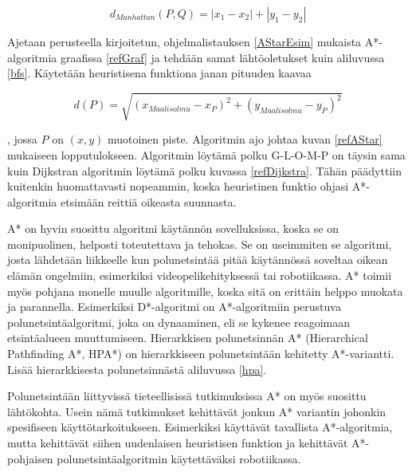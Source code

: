 \[ d_{Manhattan}(P,Q) =  |x_1 - x_2| + |y_1 - y_2|\]
\par

	Ajetaan \textcite{MathewAndMalathy} perusteella kirjoitetun, 
ohjelmalistauksen \ref{AStarEsim} mukaista A*-algoritmia graafissa 
\ref{refGraf} ja tehdään samat lähtöoletukset kuin aliluvussa \ref{bfs}. 
Käytetään heuristisena funktiona janan pituuden kaavaa

\[ d(P) = \sqrt{(x_{Maalisolmu}-x_P)^2 + (y_{Maalisolmu}-y_P)^2} \]

, jossa $P$ on $(x,y)$ muotoinen piste. Algoritmin ajo johtaa kuvan 
\ref{refAStar} mukaiseen lopputulokseen. Algoritmin löytämä polku G-L-O-M-P on 
täysin sama kuin Dijkstran algoritmin löytämä polku kuvassa 
\ref{refDijkstra}. Tähän päädyttiin kuitenkin huomattavasti nopeammin, koska 
heuristinen funktio ohjasi A*-algoritmia etsimään reittiä oikeasta suunnasta. 
\par
	A* on hyvin suosittu algoritmi käytännön sovelluksissa, koska se on 
monipuolinen, helposti toteutettava ja tehokas. Se on useimmiten se algoritmi, 
josta lähdetään liikkeelle kun polunetsintää pitää käytännössä soveltaa 
oikean elämän ongelmiin, esimerkiksi videopelikehityksessä tai 
robotiikassa.\cite{ProcediaAStar} A* toimii myös pohjana monelle muulle 
algoritmille, koska sitä on erittäin helppo muokata ja 
parannella.\cite{ProcediaAStar} Esimerkiksi D*-algoritmi on A*-algoritmiin 
perustuva polunetsintäalgoritmi, joka on dynaaminen, eli se kykenee 
reagoimaan etsintäalueen muuttumiseen.\cite{applSciLawande} Hierarkkisen 
polunetsinnän A* (Hierarchical Pathfinding A*, HPA*) on hierarkkiseen 
polunetsintään kehitetty A*-variantti. Lisää hierarkkisesta polunetsinnästä 
aliluvussa \ref{hpa}.\cite{applSciLawande} \par
	Polunetsintään liittyvissä tieteellisissä tutkimuksissa A* on myös 
suosittu lähtökohta. Usein nämä tutkimukset kehittävät jonkun A* variantin 
johonkin spesifiseen käyttötarkoitukseen.\cite{ProcediaAStar} Esimerkiksi 
\textcite{MathewAndMalathy} käyttävät tavallista A*-algoritmia, mutta 
kehittävät siihen uudenlaisen heuristisen funktion ja 
\textcite{DelaunayVoronoiAStar} kehittävät A*-pohjaisen polunetsintäalgoritmin 
käytettäväksi robotiikassa.

